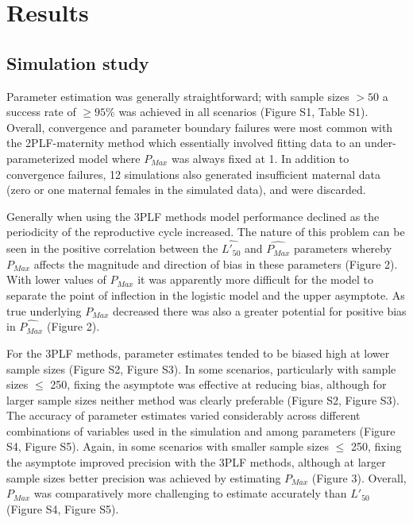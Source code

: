 \documentclass[
]{article}
\begin{document}
\section{Results}\label{results}

\subsection{Simulation study}\label{simulation-study}

Parameter estimation was generally straightforward; with sample sizes \(> 50\) a success rate of \(\geq 95\%\) was achieved in all scenarios (Figure S1, Table S1). Overall, convergence and parameter boundary failures were most common with the 2PLF-maternity method which essentially involved fitting data to an under-parameterized model where \(P_{Max}\) was always fixed at 1. In addition to convergence failures, 12 simulations also generated insufficient maternal data (zero or one maternal females in the simulated data), and were discarded.

Generally when using the 3PLF methods model performance declined as the periodicity of the reproductive cycle increased. The nature of this problem can be seen in the positive correlation between the \(\hat{L'_{50}}\) and \(\hat{P_{Max}}\) parameters whereby \(P_{Max}\) affects the magnitude and direction of bias in these parameters (Figure 2). With lower values of \(P_{Max}\) it was apparently more difficult for the model to separate the point of inflection in the logistic model and the upper asymptote. As true underlying \(P_{Max}\) decreased there was also a greater potential for positive bias in \(\hat{P_{Max}}\) (Figure 2).

For the 3PLF methods, parameter estimates tended to be biased high at lower sample sizes (Figure S2, Figure S3). In some scenarios, particularly with sample sizes \(\leq\) 250, fixing the asymptote was effective at reducing bias, although for larger sample sizes neither method was clearly preferable (Figure S2, Figure S3). The accuracy of parameter estimates varied considerably across different combinations of variables used in the simulation and among parameters (Figure S4, Figure S5). Again, in some scenarios with smaller sample sizes \(\leq\) 250, fixing the asymptote improved precision with the 3PLF methods, although at larger sample sizes better precision was achieved by estimating \(P_{Max}\) (Figure 3). Overall, \(P_{Max}\) was comparatively more challenging to estimate accurately than \(L'_{50}\) (Figure S4, Figure S5).
\end{document}
